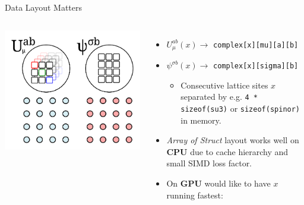 \begin{frame}{Data Layout Matters}
  \begin{columns}
      \begin{center}
        \includegraphics[width=0.85\linewidth]{graphics/grid_su3_spinor}
      \end{center}
      \begin{itemize}
        \item<1-> $U^{ab}_\mu(x) \rightarrow$ \texttt{complex[x][mu][a][b]}
        \vspace{0.2cm}
        \item<1-> $\psi^{\sigma b}(x) \rightarrow$ \texttt{complex[x][sigma][b]}
        \vspace{0.2cm}
        \begin{itemize}
          \item Consecutive lattice sites $x$ separated by e.g. \texttt{4 * sizeof(su3)} or \texttt{sizeof(spinor)} in memory.
        \end{itemize}
        \vspace{0.6cm}
        \item<3-> \emph{Array of Struct} layout works well on \textbf{CPU} due to cache hierarchy and small SIMD loss factor.
        \vspace{0.6cm}
        \item<4-> On \textbf{GPU} would like to have $x$ running fastest:
        \vspace{0.2cm}
        \begin{itemize}

\end{itemize}
\end{itemize}
\end{columns}
\end{frame}
